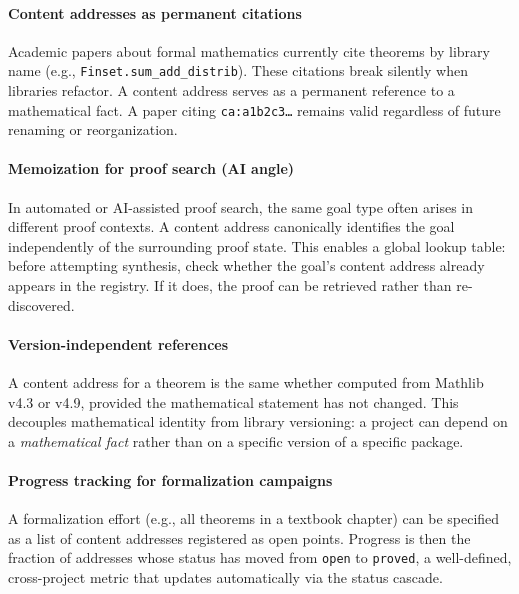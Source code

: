   \paragraph{Content addresses as permanent citations}
  \label{rem:citations}
  Academic papers about formal mathematics currently cite theorems by
  library name (e.g., \texttt{Finset.sum\_add\_distrib}).  These
  citations break silently when libraries refactor.  A content address
  serves as a permanent reference to a mathematical fact.
  A paper citing \texttt{ca:a1b2c3\ldots} remains
  valid regardless of future renaming or reorganization.

  \paragraph{Memoization for proof search (AI angle)}
  \label{rem:memoization}
  In automated or AI-assisted proof search, the same goal type often
  arises in different proof contexts.  A content address canonically
  identifies the goal independently of the surrounding proof state.
  This enables a global lookup table: before attempting synthesis, check
  whether the goal's content address already appears in the registry.
  If it does, the proof can be retrieved rather than re-discovered.

  \paragraph{Version-independent references}
  \label{rem:versions}
  A content address for a theorem is the same whether computed from
  Mathlib v4.3 or v4.9, provided the mathematical statement has not
  changed.  This decouples mathematical identity from library
  versioning: a project can depend on a \emph{mathematical fact} rather
  than on a specific version of a specific package.

  \paragraph{Progress tracking for formalization campaigns}
  \label{rem:campaigns}
  A formalization effort (e.g., all theorems in a textbook chapter) can
  be specified as a list of content addresses registered as open points.
  Progress is then the fraction of addresses whose status has moved from
  \texttt{open} to \texttt{proved}, a well-defined, cross-project
  metric that updates automatically via the status cascade.

